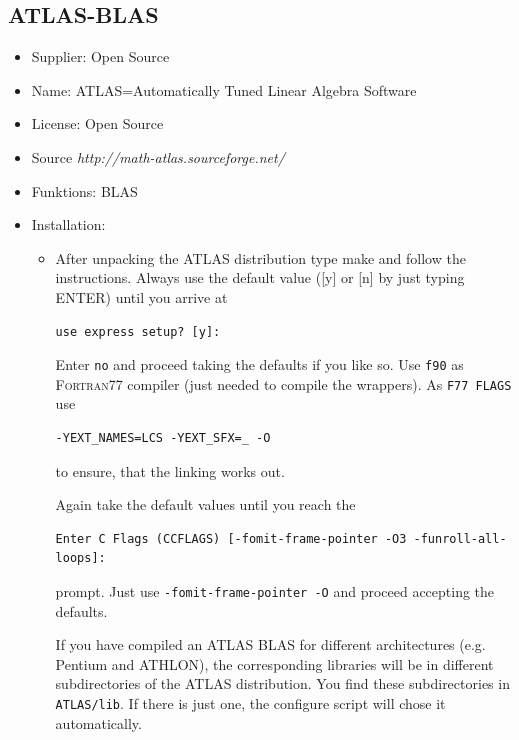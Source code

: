 \documentclass[a4paper,10pt]{report}
\begin{document}
\subsection{ATLAS-BLAS}
\begin{itemize}
\item Supplier: Open Source
\item Name: ATLAS=Automatically Tuned Linear Algebra Software
\item License: Open Source
\item Source \textit{http://math-atlas.sourceforge.net/}
\item Funktions: BLAS
\item Installation:
\begin{itemize}
\item 
After unpacking the ATLAS distribution type make and follow the
instructions. Always use the default value ([y] or [n] by just typing
ENTER) until you arrive at
\begin{verbatim}
use express setup? [y]:
\end{verbatim}
Enter \texttt{no} and proceed taking the defaults if you like so.  Use
\texttt{f90} as \textsc{Fortran77} compiler (just needed to compile
the wrappers). As \texttt{F77 FLAGS} use
\begin{verbatim}
-YEXT_NAMES=LCS -YEXT_SFX=_ -O
\end{verbatim}
to ensure, that the linking works out.

Again take the default values until you reach the 
\begin{verbatim}
Enter C Flags (CCFLAGS) [-fomit-frame-pointer -O3 -funroll-all-loops]: 
\end{verbatim}
prompt.  Just use \texttt{-fomit-frame-pointer -O} and proceed accepting the defaults.

If you have compiled an ATLAS BLAS for different architectures (e.g. Pentium
and ATHLON), the corresponding libraries will be in different subdirectories of
the ATLAS distribution. You find these subdirectories in \texttt{ATLAS/lib}.
If there is just one, the configure script will chose it
automatically. 
\end{itemize}
\end{itemize}

\end{document}
